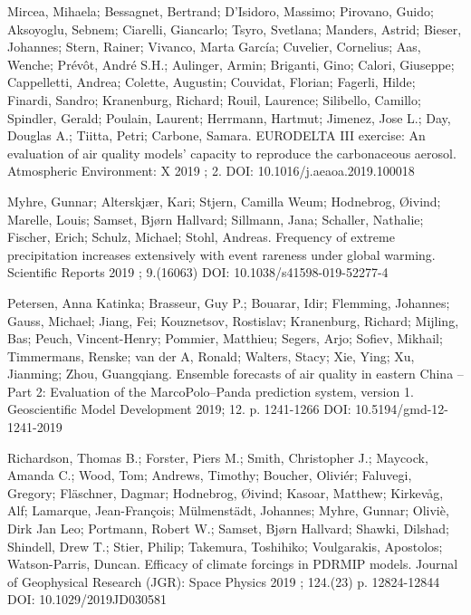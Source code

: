 \begin{list}{}{\setlength{\leftmargin}{15pt}\setlength{\itemindent}{-\leftmargin}}
\item[]
Mircea, Mihaela; Bessagnet, Bertrand; D'Isidoro, Massimo; Pirovano, Guido; Aksoyoglu, Sebnem; Ciarelli, Giancarlo; Tsyro, Svetlana; Manders, Astrid; Bieser, Johannes; Stern, Rainer; Vivanco, Marta García; Cuvelier, Cornelius; Aas, Wenche; Prévôt, André S.H.; Aulinger, Armin; Briganti, Gino; Calori, Giuseppe; Cappelletti, Andrea; Colette, Augustin; Couvidat, Florian; Fagerli, Hilde; Finardi, Sandro; Kranenburg, Richard; Rouil, Laurence; Silibello, Camillo; Spindler, Gerald; Poulain, Laurent; Herrmann, Hartmut; Jimenez, Jose L.; Day, Douglas A.; Tiitta, Petri; Carbone, Samara.
EURODELTA III exercise: An evaluation of air quality models' capacity to reproduce the carbonaceous aerosol.
Atmospheric Environment: X 2019 ; 2.
DOI: 10.1016/j.aeaoa.2019.100018

\item[]
Myhre, Gunnar; Alterskjær, Kari; Stjern, Camilla Weum; Hodnebrog, Øivind; Marelle, Louis; Samset, Bjørn Hallvard; Sillmann, Jana; Schaller, Nathalie; Fischer, Erich; Schulz, Michael; Stohl, Andreas.
Frequency of extreme precipitation increases extensively with event rareness under global warming.
Scientific Reports 2019 ; 9.(16063)
DOI: 10.1038/s41598-019-52277-4

\item[]
Petersen, Anna Katinka; Brasseur, Guy P.; Bouarar, Idir; Flemming, Johannes; Gauss, Michael; Jiang, Fei; Kouznetsov, Rostislav; Kranenburg, Richard; Mijling, Bas; Peuch, Vincent-Henry; Pommier, Matthieu; Segers, Arjo; Sofiev, Mikhail; Timmermans, Renske; van der A, Ronald; Walters, Stacy; Xie, Ying; Xu, Jianming; Zhou, Guangqiang.
Ensemble forecasts of air quality in eastern China – Part 2: Evaluation of the MarcoPolo–Panda prediction system, version 1.
Geoscientific Model Development 2019; 12. p. 1241-1266
DOI: 10.5194/gmd-12-1241-2019

\item[]
Richardson, Thomas B.; Forster, Piers M.; Smith, Christopher J.; Maycock, Amanda C.; Wood, Tom; Andrews, Timothy; Boucher, Oliviér; Faluvegi, Gregory; Fläschner, Dagmar; Hodnebrog, Øivind; Kasoar, Matthew; Kirkevåg, Alf; Lamarque, Jean-François; Mülmenstädt, Johannes; Myhre, Gunnar; Oliviè, Dirk Jan Leo; Portmann, Robert W.; Samset, Bjørn Hallvard; Shawki, Dilshad; Shindell, Drew T.; Stier, Philip; Takemura, Toshihiko; Voulgarakis, Apostolos; Watson-Parris, Duncan.
Efficacy of climate forcings in PDRMIP models.
Journal of Geophysical Research (JGR): Space Physics 2019 ; 124.(23) p. 12824-12844
DOI: 10.1029/2019JD030581


\end{list}
